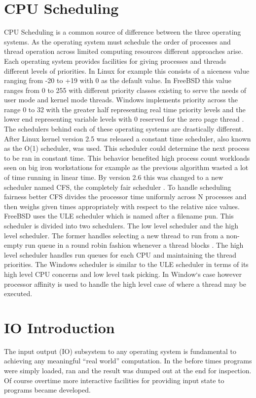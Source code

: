 \documentclass[letterpaper,10pt,draftclsnofoot,onecolumn]{IEEEtran}
\begin{document}
\section{CPU Scheduling}
CPU Scheduling is a common source of difference between the three operating systems. As the operating system must schedule the order of processes and thread operation across limited computing resources different approaches arise. Each operating system provides facilities for giving processes and threads different levels of priorities. In Linux for example this consists of a niceness value ranging from -20 to +19 with 0 as the default value. In FreeBSD this value ranges from 0 to 255 with different priority classes existing to serve the needs of user mode and kernel mode threads. Windows implements priority across the range 0 to 32 with the greater half representing real time priority levels and the lower end representing variable levels with 0 reserved for the zero page thread \cite{russinovich}.\\
The schedulers behind each of these operating systems are drastically different. After Linux kernel version 2.5 was released a constant time scheduler, also known as the O(1) scheduler, was used. This scheduler could determine the next process to be ran in constant time. This behavior benefited high process count workloads seen on big iron workstations for example as the previous algorithm wasted a lot of time running in linear time. By version 2.6 this was changed to a new scheduler named CFS, the completely fair scheduler \cite{love}. To handle scheduling fairness better CFS divides the processor time uniformly across N processes and then weighs given times appropriately with respect to the relative nice values.\\
FreeBSD uses the ULE scheduler which is named after a filename pun. This scheduler is divided into two schedulers. The low level scheduler and the high level scheduler. The former handles selecting a new thread to run from a non-empty run queue in a round robin fashion whenever a thread blocks \cite{mccusick}. The high level scheduler handles run queues for each CPU and maintaining the thread priorities. The Windows scheduler is similar to the ULE scheduler in terms of its high level CPU concerns and low level task picking. In Window`s case however processor affinity is used to handle the high level case of where a thread may be executed.
\newpage

\newpage
\section{IO Introduction}
The input output (IO) subsystem to any operating system is fundamental to achieving any meaningful “real world” computation. In the before times programs were simply loaded, ran and the result was dumped out at the end for inspection. Of course overtime more interactive facilities for providing input state to programs became developed.\\
\end{document}
